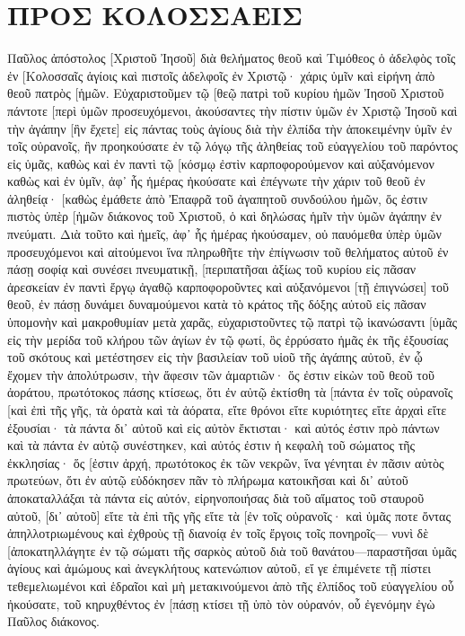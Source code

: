 \section{ΠΡΟΣ ΚΟΛΟΣΣΑΕΙΣ}
Παῦλος ἀπόστολος [Χριστοῦ Ἰησοῦ] διὰ θελήματος θεοῦ καὶ Τιμόθεος ὁ ἀδελφὸς 
τοῖς ἐν [Κολοσσαῖς ἁγίοις καὶ πιστοῖς ἀδελφοῖς ἐν Χριστῷ· χάρις ὑμῖν καὶ εἰρήνη ἀπὸ θεοῦ πατρὸς [ἡμῶν. 
Εὐχαριστοῦμεν τῷ [θεῷ πατρὶ τοῦ κυρίου ἡμῶν Ἰησοῦ Χριστοῦ πάντοτε [περὶ ὑμῶν προσευχόμενοι, 
ἀκούσαντες τὴν πίστιν ὑμῶν ἐν Χριστῷ Ἰησοῦ καὶ τὴν ἀγάπην [ἣν ἔχετε] εἰς πάντας τοὺς ἁγίους 
διὰ τὴν ἐλπίδα τὴν ἀποκειμένην ὑμῖν ἐν τοῖς οὐρανοῖς, ἣν προηκούσατε ἐν τῷ λόγῳ τῆς ἀληθείας τοῦ εὐαγγελίου 
τοῦ παρόντος εἰς ὑμᾶς, καθὼς καὶ ἐν παντὶ τῷ [κόσμῳ ἐστὶν καρποφορούμενον καὶ αὐξανόμενον καθὼς καὶ ἐν ὑμῖν, ἀφ᾽ ἧς ἡμέρας ἠκούσατε καὶ ἐπέγνωτε τὴν χάριν τοῦ θεοῦ ἐν ἀληθείᾳ· 
[καθὼς ἐμάθετε ἀπὸ Ἐπαφρᾶ τοῦ ἀγαπητοῦ συνδούλου ἡμῶν, ὅς ἐστιν πιστὸς ὑπὲρ [ἡμῶν διάκονος τοῦ Χριστοῦ, 
ὁ καὶ δηλώσας ἡμῖν τὴν ὑμῶν ἀγάπην ἐν πνεύματι. 
Διὰ τοῦτο καὶ ἡμεῖς, ἀφ᾽ ἧς ἡμέρας ἠκούσαμεν, οὐ παυόμεθα ὑπὲρ ὑμῶν προσευχόμενοι καὶ αἰτούμενοι ἵνα πληρωθῆτε τὴν ἐπίγνωσιν τοῦ θελήματος αὐτοῦ ἐν πάσῃ σοφίᾳ καὶ συνέσει πνευματικῇ, 
[περιπατῆσαι ἀξίως τοῦ κυρίου εἰς πᾶσαν ἀρεσκείαν ἐν παντὶ ἔργῳ ἀγαθῷ καρποφοροῦντες καὶ αὐξανόμενοι [τῇ ἐπιγνώσει] τοῦ θεοῦ, 
ἐν πάσῃ δυνάμει δυναμούμενοι κατὰ τὸ κράτος τῆς δόξης αὐτοῦ εἰς πᾶσαν ὑπομονὴν καὶ μακροθυμίαν μετὰ χαρᾶς, 
εὐχαριστοῦντες τῷ πατρὶ τῷ ἱκανώσαντι [ὑμᾶς εἰς τὴν μερίδα τοῦ κλήρου τῶν ἁγίων ἐν τῷ φωτί, 
ὃς ἐρρύσατο ἡμᾶς ἐκ τῆς ἐξουσίας τοῦ σκότους καὶ μετέστησεν εἰς τὴν βασιλείαν τοῦ υἱοῦ τῆς ἀγάπης αὐτοῦ, 
ἐν ᾧ ἔχομεν τὴν ἀπολύτρωσιν, τὴν ἄφεσιν τῶν ἁμαρτιῶν· 
ὅς ἐστιν εἰκὼν τοῦ θεοῦ τοῦ ἀοράτου, πρωτότοκος πάσης κτίσεως, 
ὅτι ἐν αὐτῷ ἐκτίσθη τὰ [πάντα ἐν τοῖς οὐρανοῖς [καὶ ἐπὶ τῆς γῆς, τὰ ὁρατὰ καὶ τὰ ἀόρατα, εἴτε θρόνοι εἴτε κυριότητες εἴτε ἀρχαὶ εἴτε ἐξουσίαι· τὰ πάντα δι᾽ αὐτοῦ καὶ εἰς αὐτὸν ἔκτισται· 
καὶ αὐτός ἐστιν πρὸ πάντων καὶ τὰ πάντα ἐν αὐτῷ συνέστηκεν, 
καὶ αὐτός ἐστιν ἡ κεφαλὴ τοῦ σώματος τῆς ἐκκλησίας· ὅς [ἐστιν ἀρχή, πρωτότοκος ἐκ τῶν νεκρῶν, ἵνα γένηται ἐν πᾶσιν αὐτὸς πρωτεύων, 
ὅτι ἐν αὐτῷ εὐδόκησεν πᾶν τὸ πλήρωμα κατοικῆσαι 
καὶ δι᾽ αὐτοῦ ἀποκαταλλάξαι τὰ πάντα εἰς αὐτόν, εἰρηνοποιήσας διὰ τοῦ αἵματος τοῦ σταυροῦ αὐτοῦ, [δι᾽ αὐτοῦ] εἴτε τὰ ἐπὶ τῆς γῆς εἴτε τὰ [ἐν τοῖς οὐρανοῖς· 
καὶ ὑμᾶς ποτε ὄντας ἀπηλλοτριωμένους καὶ ἐχθροὺς τῇ διανοίᾳ ἐν τοῖς ἔργοις τοῖς πονηροῖς— 
νυνὶ δὲ [ἀποκατηλλάγητε ἐν τῷ σώματι τῆς σαρκὸς αὐτοῦ διὰ τοῦ θανάτου—παραστῆσαι ὑμᾶς ἁγίους καὶ ἀμώμους καὶ ἀνεγκλήτους κατενώπιον αὐτοῦ, 
εἴ γε ἐπιμένετε τῇ πίστει τεθεμελιωμένοι καὶ ἑδραῖοι καὶ μὴ μετακινούμενοι ἀπὸ τῆς ἐλπίδος τοῦ εὐαγγελίου οὗ ἠκούσατε, τοῦ κηρυχθέντος ἐν [πάσῃ κτίσει τῇ ὑπὸ τὸν οὐρανόν, οὗ ἐγενόμην ἐγὼ Παῦλος διάκονος. 
